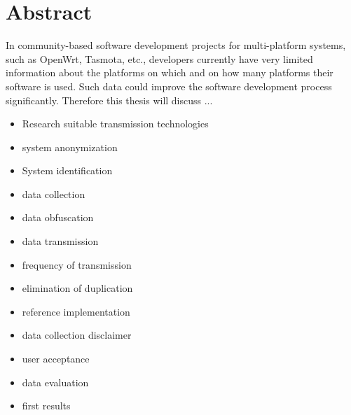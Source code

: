 \chapter*{Abstract}
\label{chap:abstract}

%
In community-based software development projects for multi-platform systems, such as OpenWrt, Tasmota, etc., developers currently have very limited information about the platforms on which and on how many platforms their software is used. Such data could improve the software development process significantly. 
Therefore this thesis will discuss ...
\begin{itemize}
    \item Research suitable transmission technologies
    \item system anonymization
    \item System identification
    \item data collection
    \item data obfuscation
    \item data transmission
    \item frequency of transmission
    \item elimination of duplication
    \item reference implementation
    \item data collection disclaimer    
    \item user acceptance
    \item data evaluation
    \item first results
\end{itemize}
